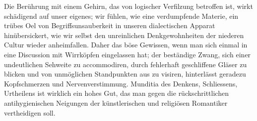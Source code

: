 Die Berührung mit einem Gehirn, das von logischer Verfilzung betroffen ist, wirkt schädigend auf unser eigenes; wir fühlen, wie eine verdumpfende Materie, ein trübes Oel von Begriffsunsauberkeit in unseren dialectischen Apparat hinübersickert, wie wir selbst den unreinlichen Denkgewohnheiten der niederen Cultur wieder anheimfallen. Daher das böse Gewissen, wenn man sich einmal in eine Discussion mit Wirrköpfen eingelassen hat; der beständige Zwang, sich einer undeutlichen Sehweite zu accommodiren, durch fehlerhaft geschliffene Gläser zu blicken und von unmöglichen Standpunkten aus zu visiren, hinterlässt geradezu Kopfschmerzen und Nervenverstimmung. Munditia des Denkens, Schliessens, Urtheilens ist wirklich ein hohes Gut, das man    gegen die rückschrittlichen antihygienischen Neigungen der künstlerischen und religiösen Romantiker vertheidigen soll.
\par

